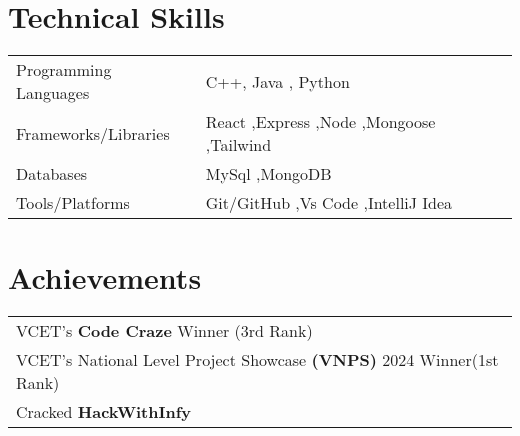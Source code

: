 \documentclass[a4paper,12pt]{article}
\begin{document}
\section{Technical Skills}
\begin{tabularx}{\linewidth}{@{}l X@{}}
Programming Languages &  \normalsize{C++, Java , Python}\\
Frameworks/Libraries &  \normalsize{React ,Express ,Node ,Mongoose ,Tailwind}\\  
Databases &  \normalsize{MySql ,MongoDB}\\ 
Tools/Platforms &  \normalsize{Git/GitHub ,Vs Code ,IntelliJ Idea}\\ 
\end{tabularx}

\section{Achievements}
\begin{tabularx}{\linewidth}{ @{}X@{} }
 VCET's \textbf{Code Craze} Winner (3rd Rank) \\
 VCET's National Level Project Showcase \textbf{(VNPS)} 2024 Winner(1st Rank) \\
 Cracked \textbf{HackWithInfy} 
\end{tabularx}
\end{document}
